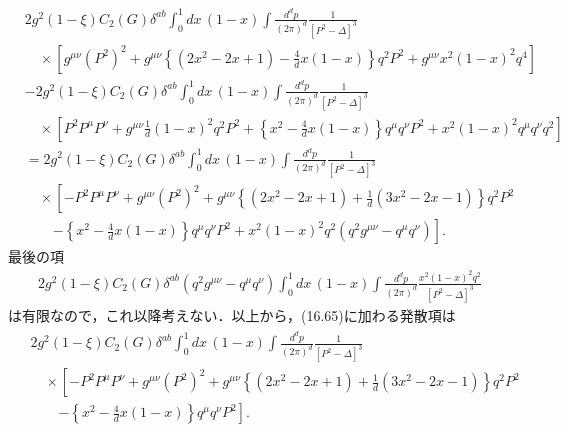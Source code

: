 \begin{align*}
  & 2 g^2 (1-\xi) C_2(G) \delta^{ab} \int_0^1 dx \, (1-x) \int \frac{d^dp}{(2\pi)^d} \frac{1}{[P^2-\Delta]^3} \\
  &\quad\times \left[ g^{\mu\nu} (P^2)^2 + g^{\mu\nu} \left\{ (2x^2-2x+1) - \frac{4}{d} x(1-x) \right\} q^2 P^2 + g^{\mu\nu} x^2(1-x)^2 q^4 \right] \\
  & - 2 g^2 (1-\xi) C_2(G) \delta^{ab} \int_0^1 dx \, (1-x) \int \frac{d^dp}{(2\pi)^d} \frac{1}{[P^2-\Delta]^3} \\
  &\quad\times \left[ P^2 P^\mu P^\nu + g^{\mu\nu} \frac{1}{d} (1-x)^2 q^2 P^2
  + \left\{ x^2 - \frac{4}{d}x(1-x) \right\} q^\mu q^\nu P^2
  + x^2(1-x)^2 q^\mu q^\nu q^2 \right] \\
  &= 2 g^2 (1-\xi) C_2(G) \delta^{ab} \int_0^1 dx \, (1-x) \int \frac{d^dp}{(2\pi)^d} \frac{1}{[P^2-\Delta]^3} \\
  &\quad\times \left[ - P^2 P^\mu P^\nu + g^{\mu\nu} (P^2)^2 + g^{\mu\nu} \left\{ (2x^2-2x+1) + \frac{1}{d} (3x^2-2x-1) \right\} q^2 P^2 \right. \\
  &\qquad \left. - \left\{ x^2 - \frac{4}{d}x(1-x) \right\} q^\mu q^\nu P^2 + x^2(1-x)^2 q^2 (q^2g^{\mu\nu}-q^\mu q^\nu) \right] .
\end{align*}
最後の項
\begin{align}
  2 g^2 (1-\xi) C_2(G) \delta^{ab} (q^2g^{\mu\nu}-q^\mu q^\nu) \int_0^1 dx \, (1-x)
  \int \frac{d^dp}{(2\pi)^d} \frac{x^2(1-x)^2 q^2 }{[P^2-\Delta]^3}
\end{align}
は有限なので，これ以降考えない．以上から，(16.65)に加わる発散項は
\begin{align}
  \begin{split}
    & 2 g^2 (1-\xi) C_2(G) \delta^{ab} \int_0^1 dx \, (1-x) \int \frac{d^dp}{(2\pi)^d} \frac{1}{[P^2-\Delta]^3} \\
    &\quad\times \left[ - P^2 P^\mu P^\nu + g^{\mu\nu} (P^2)^2 + g^{\mu\nu} \left\{ (2x^2-2x+1) + \frac{1}{d} (3x^2-2x-1) \right\} q^2 P^2 \right. \\
    &\qquad \left. - \left\{ x^2 - \frac{4}{d}x(1-x) \right\} q^\mu q^\nu P^2 \right] .
  \end{split}
  \label{eq_17_72_modify_16_65}
\end{align}

